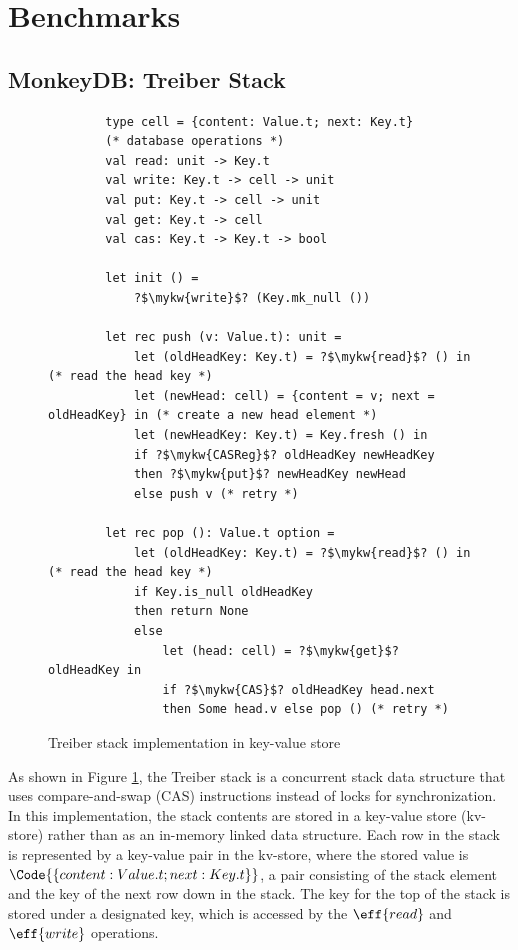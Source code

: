 \section{Benchmarks}

\subsection{MonkeyDB: Treiber Stack}

\begin{figure}[h!]
    \centering
    \begin{verbatim}
        type cell = {content: Value.t; next: Key.t}
        (* database operations *)
        val read: unit -> Key.t
        val write: Key.t -> cell -> unit
        val put: Key.t -> cell -> unit
        val get: Key.t -> cell
        val cas: Key.t -> Key.t -> bool

        let init () =
            ?$\mykw{write}$? (Key.mk_null ())

        let rec push (v: Value.t): unit =
            let (oldHeadKey: Key.t) = ?$\mykw{read}$? () in (* read the head key *)
            let (newHead: cell) = {content = v; next = oldHeadKey} in (* create a new head element *)
            let (newHeadKey: Key.t) = Key.fresh () in
            if ?$\mykw{CASReg}$? oldHeadKey newHeadKey
            then ?$\mykw{put}$? newHeadKey newHead
            else push v (* retry *)

        let rec pop (): Value.t option =
            let (oldHeadKey: Key.t) = ?$\mykw{read}$? () in (* read the head key *)
            if Key.is_null oldHeadKey
            then return None 
            else
                let (head: cell) = ?$\mykw{get}$? oldHeadKey in
                if ?$\mykw{CAS}$? oldHeadKey head.next 
                then Some head.v else pop () (* retry *)
    \end{verbatim}
    \caption{Treiber stack implementation in key-value store}
    \label{fig:treiber-stack-imp}
\end{figure}

As shown in Figure \ref{fig:treiber-stack-imp}, the Treiber stack is a concurrent stack data structure that uses compare-and-swap (CAS) instructions instead of locks for synchronization. In this implementation, the stack contents are stored in a key-value store (kv-store) rather than as an in-memory linked data structure. Each row in the stack is represented by a key-value pair in the kv-store, where the stored value is $\Code{\{content: Value.t; next: Key.t\}}$, a pair consisting of the stack element and the key of the next row down in the stack. The key for the top of the stack is stored under a designated key, which is accessed by the $\eff{read}$ and $\eff{write}$ operations.

